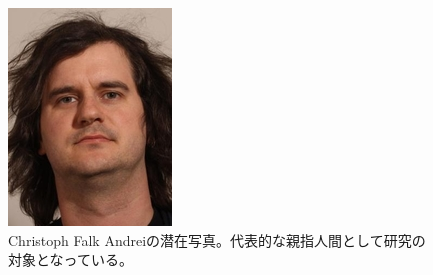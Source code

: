 \documentclass[12pt]{jsarticle}
\begin{document}
\begin{figure}
\centering
\includegraphics[scale=1]{figure/Christoph}
\caption{Christoph Falk Andreiの潜在写真。代表的な親指人間として研究の対象となっている。}
\label{oyayubi}
\end{figure}
\end{document}
